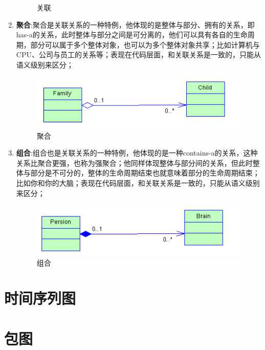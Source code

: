\documentclass[UTF8,a4paper,12pt]{ctexbook}
\begin{document}
\begin{enumerate}
\begin{figure}[h]
					\caption{关联}
				\end{figure}
			\item \textbf{聚合}:聚合是关联关系的一种特例，他体现的是整体与部分、拥有的关系，即has-a的关系，此时整体与部分之间是可分离的，他们可以具有各自的生命周期，部分可以属于多个整体对象，也可以为多个整体对象共享；比如计算机与CPU、公司与员工的关系等；表现在代码层面，和关联关系是一致的，只能从语义级别来区分； 
				\begin{figure}[h]
					\centering
					\includegraphics[scale = 0.7]{Aggregation.jpg}
					\caption{聚合}
				\end{figure}
			\item \textbf{组合}:组合也是关联关系的一种特例，他体现的是一种contains-a的关系，这种关系比聚合更强，也称为强聚合；他同样体现整体与部分间的关系，但此时整体与部分是不可分的，整体的生命周期结束也就意味着部分的生命周期结束；比如你和你的大脑；表现在代码层面，和关联关系是一致的，只能从语义级别来区分； 
				\begin{figure}[h]
					\centering
					\includegraphics[scale = 0.7]{Composition.jpg}
					\caption{组合}
				\end{figure}
		\end{enumerate}

	\section{时间序列图}
	
	
	\section{包图}
\end{document}
